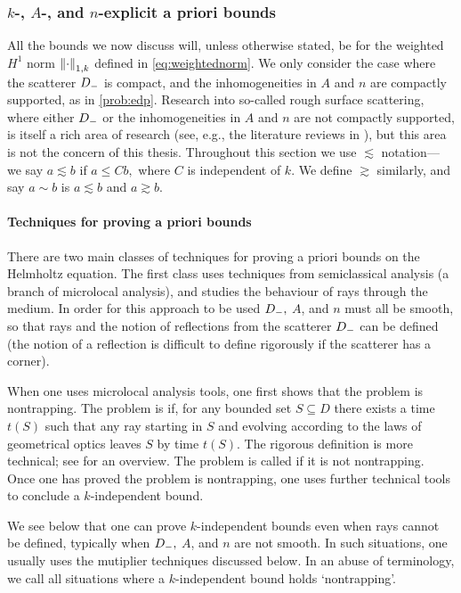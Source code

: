 \subsubsection{$k$-, $A$-, and $n$-explicit a priori bounds}
 All the bounds we now discuss will, unless otherwise stated, be for the weighted $H^1$ norm $\NW{\cdot}$ defined in \cref{eq:weightednorm}. We  only consider the case where the scatterer $D_{-}$ is compact, and the inhomogeneities in $A$ and $n$ are compactly supported, as in \cref{prob:edp}. Research into so-called rough surface scattering, where either $D_{-}$ or the inhomogeneities in $A$ and $n$ are not compactly supported, is itself a rich area of research (see, e.g., the literature reviews in \cite{Th:06}), but this area is not the concern of this thesis. Throughout this section we use $\lesssim$ notation--- we say $a \lesssim b$ if $a \leq C b,$ where $C$ is independent of $k$. We define $\gtrsim$ similarly, and say $a \sim b$ is $a \lesssim b$ and $a \gtrsim b.$


\paragraph{Techniques for proving a priori bounds} There are two main classes of techniques for proving a priori bounds on the Helmholtz equation. The first class uses techniques from semiclassical analysis (a branch of microlocal analysis), and studies the behaviour of rays through the medium. In order for this approach to be used $D_{-},$ $A$, and $n$ must all be smooth, so that rays and the notion of reflections from the scatterer $D_{-}$ can be defined (the notion of a reflection is difficult to define rigorously if the scatterer has a corner). 

When one uses microlocal analysis tools, one first shows that the problem is nontrapping. The problem is  if, for any bounded set $S \subseteq D$ there exists a time $t(S)$ such that any ray starting in $S$ and evolving according to the laws of geometrical optics leaves $S$ by time $t(S)$. The rigorous definition is more technical; see \cite[Section 6]{GrPeSp:19} for an overview. The problem is called  if it is not nontrapping. Once one has proved the problem is nontrapping, one uses further technical tools to conclude a $k$-independent bound.


We see below that one can prove $k$-independent bounds even when rays cannot be defined, typically when $D_{-},$ $A$, and $n$ are not smooth. In such situations, one usually uses the mutiplier techniques discussed below. In an abuse of terminology, we call all situations where a $k$-independent bound holds `nontrapping'.\label{pg:informalnontrapping}



